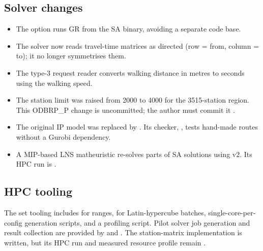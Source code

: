 \subsection{Solver changes}

\begin{itemize}
\item The  option runs GR from the SA binary, avoiding
  a separate code base.
\item The solver now reads travel-time matrices as directed (row = from,
  column = to); it no longer symmetrises them.
\item The type-3 request reader converts walking distance in metres to seconds
  using the walking speed.
\item The station limit was raised from 2000 to 4000 for the 3515-station
  region. This ODBRP\_P change is uncommitted; the author must commit it
  \tagopen[A4].
\item The original IP model was replaced by
  . Its checker,
  , tests hand-made routes without a Gurobi
  dependency.
\item A MIP-based LNS matheuristic re-solves parts of SA solutions using v2.
  Its HPC run is \tagopen[A2].
\end{itemize}

\subsection{HPC tooling}

The set tooling includes  for ranges,
 for Latin-hypercube batches,
single-core-per-config generation scripts, and a profiling script. Pilot
solver job generation and result collection are provided by
 and
. The station-matrix implementation is
written, but its HPC run and measured resource profile remain \tagopen[G3].
